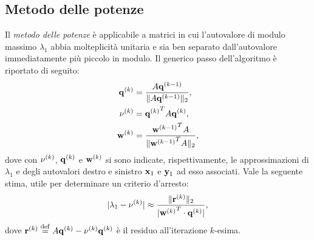 \subsection*{Metodo delle potenze}

Il \emph{metodo delle potenze} \`e applicabile a matrici in cui
l'autovalore di modulo massimo $\lambda_1$ abbia molteplicit\`a
unitaria e sia ben separato dall'autovalore immediatamente pi\`u
piccolo in modulo. Il generico passo dell'algoritmo \`e riportato di
seguito:
\begin{align*}
    {\bf q}^{\left( k\right)} &= \frac{ A{\bf q}^{\left( k-1\right)} }{
        \|  A{\bf q}^{\left( k-1\right)}\|_2 },\\
    {\bf \nu}^{\left( k\right)} &= {{\bf q}^{\left( k\right)}}^T  A {\bf q}^{\left( k\right)},\\
    {\bf w}^{\left( k\right)} &= \frac{ {{\bf w}^{\left( k-1\right)}}^T A }{
        \|  {{\bf w}^{\left( k-1\right)}}^T A\|_2 },
\end{align*}
dove con $\nu^{\left( k\right)}$, ${\bf q}^{\left( k\right)}$ e ${\bf w}^{\left( k\right)}$ si sono
indicate, rispettivamente, le approssimazioni di $\lambda_1$ e degli
autovalori destro e sinistro ${\bf x}_1$ e ${\bf y}_1$ ad esso
associati. Vale la seguente stima, utile per determinare un criterio
d'arresto:
\begin{align*}
    \module{ \lambda_1 - \nu\iter{k} } \approx %
    \frac{ \norm{ {\bf r}\iter{k} }_2 }{
    \module{ {{\bf w}\iter{k}}^T \cdot{\bf q}\iter{k} } },
\end{align*}
dove ${\bf r}^{\left( k\right)} \stackrel{\mathrm{def}}{=} A{\bf q}^{\left( k\right)} - \nu^{\left( k\right)}{\bf
q}^{\left( k\right)}$ \`e il residuo all'iterazione $k$-esima.
